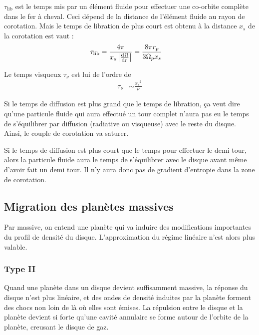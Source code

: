 $\tau_\text{lib}$ est le temps mis par un élément fluide pour effectuer une co-orbite complète dans le fer à cheval. Ceci dépend de la distance de l'élément fluide au rayon de corotation. Mais le temps de libration de plus court est obtenu à la distance $x_s$ de la corotation est vaut \citep{baruteau2008PhD} : 
\begin{align}
\tau_\text{lib} &= \frac{4\pi}{x_s\abs{\od{\Omega}{r}}} = \frac{8\pi r_p}{3\Omega_p x_s}
\end{align}

Le temps visqueux $\tau_\nu$ est lui de l'ordre de \citep{masset2001coorbital, masset2002coorbital, ogilvie2003saturation}
\begin{align}
\tau_\nu &\sim \frac{{x_s}^2}{\nu}
\end{align}

Si le temps de diffusion est plus grand que le temps de libration, ça veut dire qu'une particule fluide qui aura effectué un tour complet n'aura pas eu le temps de s'équilibrer par diffusion (radiative ou visqueuse) avec le reste du disque. Ainsi, le couple de corotation va saturer.

Si le temps de diffusion est plus court que le temps pour effectuer le demi tour, alors la particule fluide aura le temps de s'équilibrer avec le disque avant même d'avoir fait un demi tour. Il n'y aura donc pas de gradient d'entropie dans la zone de corotation. %

\subsection{Migration des planètes massives}
Par massive, on entend une planète qui va induire des modifications importantes du profil de densité du disque. L'approximation du régime linéaire n'est alors plus valable. 

\subsubsection{Type II}
Quand une planète dans un disque devient suffisamment massive, la réponse du disque n'est plus linéaire, et des ondes de densité induites par la planète forment des chocs non loin de là où elles sont émises. La répulsion entre le disque et la planète devient si forte qu'une cavité annulaire se forme autour de l'orbite de la planète, creusant le disque de gaz.

